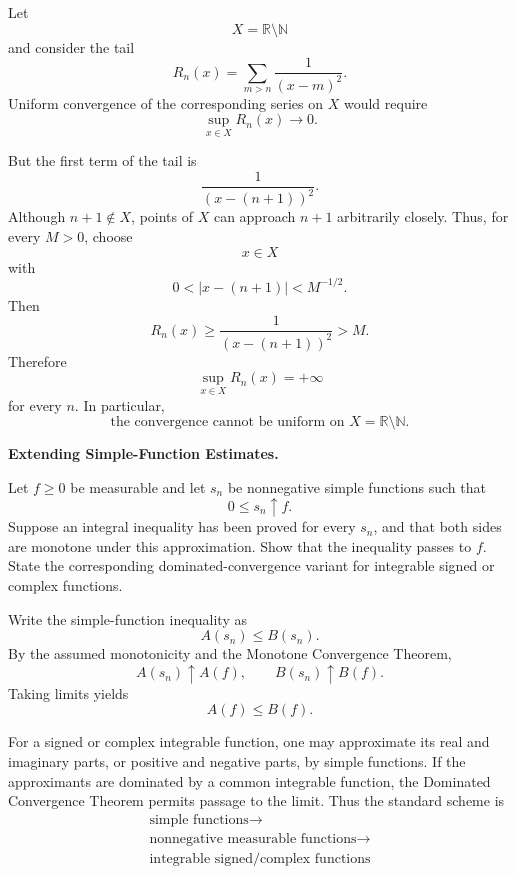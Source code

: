 \begin{solution}
Let
\[
X=\mathbb R\setminus\mathbb N
\]
and consider the tail
\[
R_n(x)
=
\sum_{m>n}\frac1{(x-m)^2}.
\]
Uniform convergence of the corresponding series on \(X\) would require
\[
\sup_{x\in X}R_n(x)\to0.
\]

But the first term of the tail is
\[
\frac1{(x-(n+1))^2}.
\]
Although \(n+1\notin X\), points of \(X\) can approach \(n+1\) arbitrarily closely. Thus,
for every \(M>0\), choose
\[
x\in X
\]
with
\[
0<|x-(n+1)|<M^{-1/2}.
\]
Then
\[
R_n(x)
\ge
\frac1{(x-(n+1))^2}
>
M.
\]
Therefore
\[
\sup_{x\in X}R_n(x)=+\infty
\]
for every \(n\). In particular,
\[
\boxed{
\text{the convergence cannot be uniform on }X=\mathbb R\setminus\mathbb N.
}
\]
\end{solution}


\begin{problem}[CP-II-0087]
\label{prob:cp-ii-0087}
\textbf{Extending Simple-Function Estimates.}

\hspace*{1.5em}Let \(f\ge0\) be measurable and let \(s_n\) be nonnegative simple functions
such that
\[
0\le s_n\uparrow f.
\]
Suppose an integral inequality has been proved for every \(s_n\), and that both
sides are monotone under this approximation. Show that the inequality passes to
\(f\). State the corresponding dominated-convergence variant for integrable
signed or complex functions.
\end{problem}

\begin{solution}
Write the simple-function inequality as
\[
A(s_n)\le B(s_n).
\]
By the assumed monotonicity and the Monotone Convergence Theorem,
\[
A(s_n)\uparrow A(f),
\qquad
B(s_n)\uparrow B(f).
\]
Taking limits yields
\[
\boxed{A(f)\le B(f).}
\]

For a signed or complex integrable function, one may approximate its real and
imaginary parts, or positive and negative parts, by simple functions. If the
approximants are dominated by a common integrable function, the Dominated
Convergence Theorem permits passage to the limit. Thus the standard scheme is
\[
\boxed{\begin{gathered}
\text{simple functions}\longrightarrow
\\
\text{nonnegative measurable functions}\longrightarrow
\\
\text{integrable signed/complex functions}
\end{gathered}}
\]
\end{solution}


